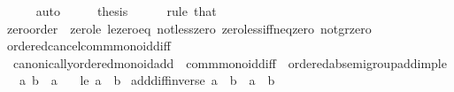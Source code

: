 \begin{isabellebody}
\ \ \ \ \isamarkupfalse%
\ auto\isanewline
\ \ \isamarkupfalse%
\ \isamarkupfalse%
\ {\isacharquery}{\kern0pt}thesis\isanewline
\ \ \ \ \isamarkupfalse%
\ {\isacharparenleft}{\kern0pt}rule\ that{\isacharparenright}{\kern0pt}\isanewline
{}\isamarkupfalse%
%
\endisatagproof
{\isafoldproof}%
%
\isadelimproof
\isanewline
%
\endisadelimproof
\isanewline
{}\isamarkupfalse%
\ zero{\isacharunderscore}{\kern0pt}order\ {\isacharequal}{\kern0pt}\ zero{\isacharunderscore}{\kern0pt}le\ le{\isacharunderscore}{\kern0pt}zero{\isacharunderscore}{\kern0pt}eq\ not{\isacharunderscore}{\kern0pt}less{\isacharunderscore}{\kern0pt}zero\ zero{\isacharunderscore}{\kern0pt}less{\isacharunderscore}{\kern0pt}iff{\isacharunderscore}{\kern0pt}neq{\isacharunderscore}{\kern0pt}zero\ not{\isacharunderscore}{\kern0pt}gr{\isacharunderscore}{\kern0pt}zero\isanewline
\ \ %
\isanewline
\isanewline
{}\isamarkupfalse%
\isanewline
\isanewline
{}\isamarkupfalse%
\ ordered{\isacharunderscore}{\kern0pt}cancel{\isacharunderscore}{\kern0pt}comm{\isacharunderscore}{\kern0pt}monoid{\isacharunderscore}{\kern0pt}diff\ {\isacharequal}{\kern0pt}\isanewline
\ \ canonically{\isacharunderscore}{\kern0pt}ordered{\isacharunderscore}{\kern0pt}monoid{\isacharunderscore}{\kern0pt}add\ {\isacharplus}{\kern0pt}\ comm{\isacharunderscore}{\kern0pt}monoid{\isacharunderscore}{\kern0pt}diff\ {\isacharplus}{\kern0pt}\ ordered{\isacharunderscore}{\kern0pt}ab{\isacharunderscore}{\kern0pt}semigroup{\isacharunderscore}{\kern0pt}add{\isacharunderscore}{\kern0pt}imp{\isacharunderscore}{\kern0pt}le\isanewline
{}\isanewline
\isanewline
{}\isamarkupfalse%
\isanewline
\ \ \ a\ b\ {\isacharcolon}{\kern0pt}{\isacharcolon}{\kern0pt}\ {\isacharprime}{\kern0pt}a\isanewline
\ \ \ le{\isacharcolon}{\kern0pt}\ {\isachardoublequoteopen}a\ {\isasymle}\ b{\isachardoublequoteclose}\isanewline
{}\isanewline
\isanewline
{}\isamarkupfalse%
\ add{\isacharunderscore}{\kern0pt}diff{\isacharunderscore}{\kern0pt}inverse{\isacharcolon}{\kern0pt}\ {\isachardoublequoteopen}a\ {\isacharplus}{\kern0pt}\ {\isacharparenleft}{\kern0pt}b\ {\isacharminus}{\kern0pt}\ a{\isacharparenright}{\kern0pt}\ {\isacharequal}{\kern0pt}\ b{\isachardoublequoteclose}\isanewline
%
\isadelimproof

\end{isabellebody}

